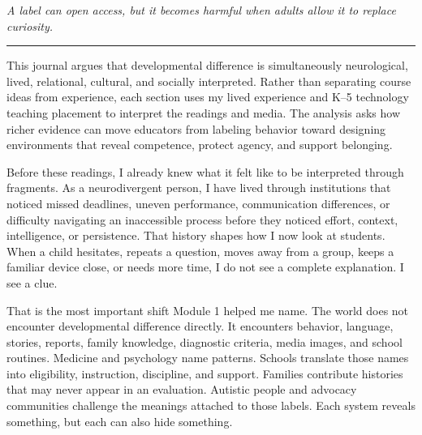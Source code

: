 \documentclass[11pt]{article}
\newcommand{\reviewsection}[1]{\vspace{0.07in}\noindent{\normalsize\bfseries\color{PrimaryRed}#1}\par\vspace{0.02in}}
\begin{document}
\begin{titlepage}
\vfill

\begin{center}
\begin{minipage}{0.92\textwidth}
\centering\itshape
A label can open access, but it becomes harmful when adults allow it to replace curiosity.\\
{\color{PrimaryRed}\rule{4in}{0.8pt}}
\end{minipage}
\end{center}

\vfill

\begin{center}
\begin{minipage}{0.95\textwidth}
\small
This journal argues that developmental difference is simultaneously neurological, lived, relational, cultural, and socially interpreted. Rather than separating course ideas from experience, each section uses my lived experience and K--5 technology teaching placement to interpret the readings and media. The analysis asks how richer evidence can move educators from labeling behavior toward designing environments that reveal competence, protect agency, and support belonging.
\end{minipage}
\end{center}

\restoregeometry
\end{titlepage}
\hypersetup{pageanchor=true}

\reviewsection{What I Noticed Before I Had the Language}

Before these readings, I already knew what it felt like to be interpreted through fragments. As a neurodivergent person, I have lived through institutions that noticed missed deadlines, uneven performance, communication differences, or difficulty navigating an inaccessible process before they noticed effort, context, intelligence, or persistence. That history shapes how I now look at students. When a child hesitates, repeats a question, moves away from a group, keeps a familiar device close, or needs more time, I do not see a complete explanation. I see a clue.

That is the most important shift Module 1 helped me name. The world does not encounter developmental difference directly. It encounters behavior, language, stories, reports, family knowledge, diagnostic criteria, media images, and school routines. Medicine and psychology name patterns. Schools translate those names into eligibility, instruction, discipline, and support. Families contribute histories that may never appear in an evaluation. Autistic people and advocacy communities challenge the meanings attached to those labels. Each system reveals something, but each can also hide something.
\end{document}
